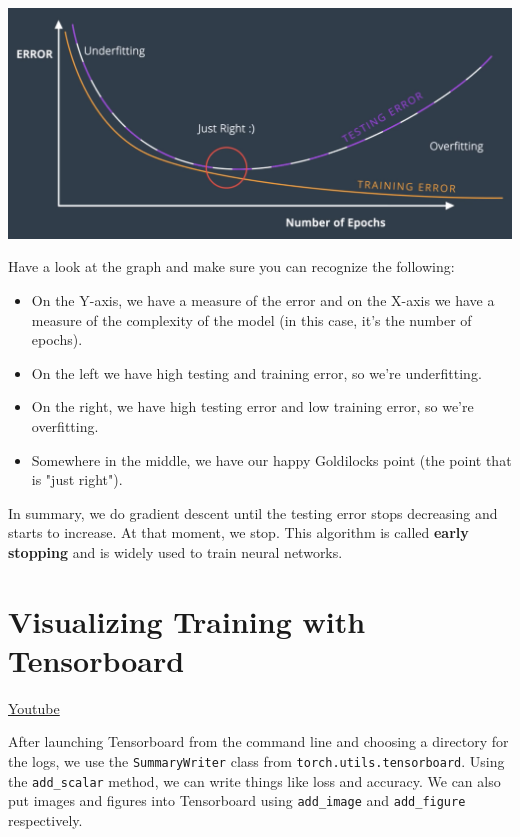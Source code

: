 \includegraphics[width=1\linewidth]{img//intro//trainingNN/early-stopping.png}

Have a look at the graph and make sure you can recognize the following:

\begin{itemize}
    \item On the Y-axis, we have a measure of the error and on the X-axis we have a measure of the complexity of the model (in this case, it's the number of epochs).
    \item On the left we have high testing and training error, so we're underfitting.
    \item On the right, we have high testing error and low training error, so we're overfitting.
    \item Somewhere in the middle, we have our happy Goldilocks point (the point that is "just right").
\end{itemize}
In summary, we do gradient descent until the testing error stops decreasing and starts to increase. At that moment, we stop. This algorithm is called \textbf{early stopping} and is widely used to train neural networks.


\section{Visualizing Training with Tensorboard}
\href{https://www.youtube.com/watch?v=MKoW6vUYStk&t=1s&ab_channel=Udacity}{Youtube} \newline

After launching Tensorboard from the command line and choosing a directory for the logs, we use the \verb|SummaryWriter| class from \verb|torch.utils.tensorboard|. Using the \verb|add_scalar| method, we can write things like loss and accuracy. We can also put images and figures into Tensorboard using \verb|add_image| and \verb|add_figure| respectively. \newline

